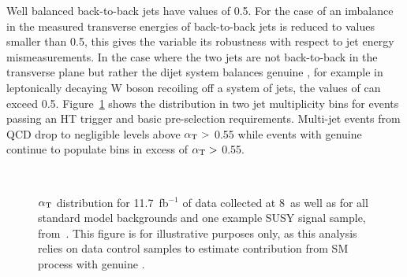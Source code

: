 Well balanced back-to-back jets have \alphat values of 0.5. 
For the case of an imbalance in the measured transverse energies 
of back-to-back jets \alphat is reduced to values smaller than 0.5, 
this gives the variable its robustness with respect to jet energy 
mismeasurements. In the case where the two jets are not back-to-back 
in the transverse plane but rather the dijet system balances genuine 
\met, for example in leptonically decaying W boson recoiling off a 
system of jets, the values of \alphat can exceed 0.5.
Figure~\ref{fig:alphat_dist} shows the \alphat 
distribution in two jet multiplicity bins for events passing 
an HT trigger and basic pre-selection requirements. Multi-jet 
events from QCD drop to negligible levels above $\alpha_{\text{T}}>$ 0.55
while events with genuine \met continue to populate bins in excess
of  $\alpha_{\text{T}}>$ 0.55.

\begin{figure}[h!t]
  \begin{center}
     \\
      \caption{\label{fig:alphat-2011} $\alpha_{\text{T}}$ distribution for 11.7~fb$^{-1}$ 
            of data collected at {8}~\tev as well as for all standard model 
            backgrounds and one example SUSY signal sample, from~\cite{RA1Paper2012}.
            This figure is for illustrative purposes only, as this analysis relies
            on data control samples to estimate contribution from SM process 
            with genuine \met.}
    \label{fig:alphat_dist}
  \end{center}
\end{figure}

